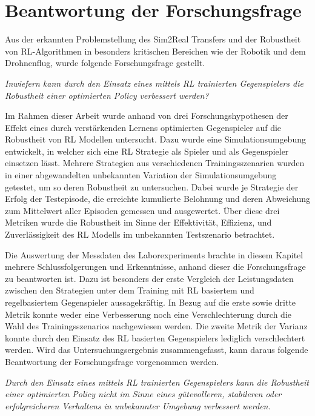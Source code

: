 \section{Beantwortung der Forschungsfrage}

Aus der erkannten Problemstellung des Sim2Real Transfers und der Robustheit von RL-Algorithmen in besonders kritischen Bereichen wie der Robotik und dem Drohnenflug, wurde folgende Forschungsfrage gestellt.

\textit{Inwiefern kann durch den Einsatz eines mittels RL trainierten Gegenspielers die Robustheit einer optimierten Policy verbessert werden?}

Im Rahmen dieser Arbeit wurde anhand von drei Forschungshypothesen der Effekt eines durch verstärkenden Lernens optimierten Gegenspieler auf die Robustheit von RL Modellen untersucht.
Dazu wurde eine Simulationsumgebung entwickelt, in welcher sich eine RL Strategie als Spieler und als Gegenspieler einsetzen lässt.
Mehrere Strategien aus verschiedenen Trainingsszenarien wurden in einer abgewandelten unbekannten Variation der Simulationsumgebung getestet, um so deren Robustheit zu untersuchen.
Dabei wurde je Strategie der Erfolg der Testepisode, die erreichte kumulierte Belohnung und deren Abweichung zum Mittelwert aller Episoden gemessen und ausgewertet. 
Über diese drei Metriken wurde die Robustheit im Sinne der Effektivität, Effizienz, und Zuverlässigkeit des RL Modells im unbekannten Testszenario betrachtet.

Die Auswertung der Messdaten des Laborexperiments brachte in diesem Kapitel mehrere Schlussfolgerungen und Erkenntnisse, anhand dieser die Forschungsfrage zu beantworten ist.
Dazu ist besonders der erste Vergleich der Leistungsdaten zwischen den Strategien unter dem Training mit RL basiertem und regelbasiertem Gegenspieler aussagekräftig.
In Bezug auf die erste sowie dritte Metrik konnte weder eine Verbesserung noch eine Verschlechterung durch die Wahl des Trainingsszenarios nachgewiesen werden.
Die zweite Metrik der Varianz konnte durch den Einsatz des RL basierten Gegenspielers lediglich verschlechtert werden.
Wird das Untersuchungsergebnis zusammengefasst, kann daraus folgende Beantwortung der Forschungsfrage vorgenommen werden.

\textit{Durch den Einsatz eines mittels RL trainierten Gegenspielers kann die Robustheit einer optimierten Policy nicht im Sinne eines gütevolleren, stabileren oder erfolgreicheren Verhaltens in unbekannter Umgebung verbessert werden.}

